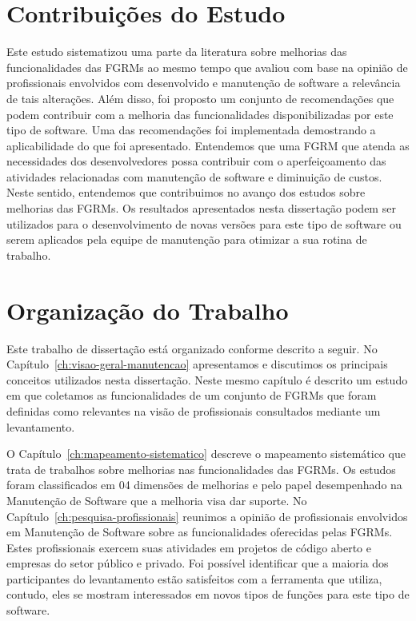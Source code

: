 \section{Contribuições do Estudo}
\label{sec:intro-contribuicao}

Este estudo sistematizou uma parte da literatura sobre melhorias das
funcionalidades das FGRMs ao mesmo tempo que avaliou com base na opinião de
profissionais envolvidos com desenvolvido e manutenção de software a relevância
de tais alterações. Além disso, foi proposto um conjunto de recomendações que
podem contribuir com a melhoria das funcionalidades disponibilizadas por este
tipo de software. Uma das recomendações foi implementada demostrando a
aplicabilidade do que foi apresentado. Entendemos que uma FGRM que atenda as
necessidades dos desenvolvedores possa contribuir com o aperfeiçoamento das
atividades relacionadas com manutenção de software e diminuição de custos. Neste
sentido, entendemos que contribuimos no avanço dos estudos sobre melhorias das
FGRMs. Os resultados apresentados nesta dissertação podem ser utilizados para o
desenvolvimento de novas versões para este tipo de software ou serem aplicados
pela equipe de manutenção para otimizar a sua rotina de trabalho.

\section{Organização do Trabalho}
\label{sec:intro-organizacao-dissertacao}

Este trabalho de dissertação está organizado conforme descrito a seguir. No
Capítulo~\ref{ch:visao-geral-manutencao} apresentamos e discutimos os principais
conceitos utilizados nesta dissertação. Neste mesmo capítulo é descrito um
estudo em que coletamos as funcionalidades de um conjunto de FGRMs que foram
definidas como relevantes na visão de profissionais consultados mediante um
levantamento.

O Capítulo~\ref{ch:mapeamento-sistematico} descreve o mapeamento sistemático que
trata de trabalhos sobre melhorias nas funcionalidades das FGRMs. Os estudos
foram classificados em 04 dimensões de melhorias e pelo papel desempenhado na
Manutenção de Software que a melhoria visa dar suporte. No
Capítulo~\ref{ch:pesquisa-profissionais} reunimos a opinião de profissionais
envolvidos em Manutenção de Software sobre as funcionalidades oferecidas pelas
FGRMs. Estes profissionais exercem suas atividades em projetos de código aberto
e empresas do setor público e privado. Foi possível identificar que a maioria
dos participantes do levantamento estão satisfeitos com a ferramenta que
utiliza, contudo, eles se mostram interessados em novos tipos de funções para
este tipo de software.

